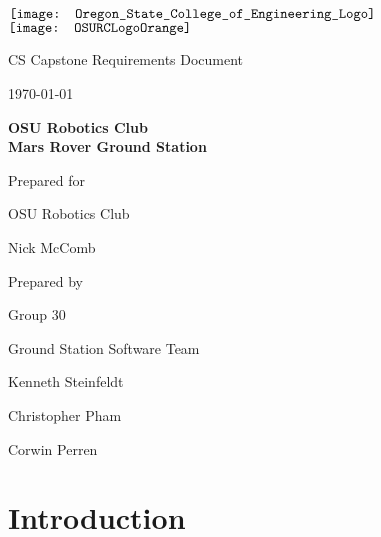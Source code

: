 \documentclass[onecolumn, draftclsnofoot, 10pt, compsoc]{IEEEtran}
\def \CapstoneTeamName{			Ground Station Software Team}
\def \CapstoneTeamNumber{		30}
\def \GroupMemberOne{			Kenneth Steinfeldt}
\def \GroupMemberTwo{			Christopher Pham}
\def \GroupMemberThree{			Corwin Perren}
\def \CapstoneProjectName{		OSU Robotics Club\\Mars Rover Ground Station}
\def \CapstoneSponsorCompany{	OSU Robotics Club}
\def \CapstoneSponsorPerson{	Nick McComb}
\def \DocType{	%
				Requirements Document
			 }
\newcommand{\NameSigPair}[1]{
  \par
  \makebox[2.75in][r]{#1} 
  \hfill
  \makebox[3.25in]{
      \makebox[2.25in]{\hrulefill} 
      \hfill
      \makebox[.75in]{\hrulefill}
  }
  \par\vspace{-12pt} 
  \textit{
      \tiny\noindent
      \makebox[2.75in]{} 
      \hfill
      \makebox[3.25in]{
          \makebox[2.25in][r]{Signature} 
          \hfill
          \makebox[.75in][r]{Date}
      }
  }
}
\renewcommand{\NameSigPair}[1]{#1}
\begin{document}
\begin{titlepage}
	\begin{singlespace}
        \begin{minipage}{7in}
			\centering
			\hspace*{-.7in}
			$\vcenter{\hbox{\texttt{[image: Oregon\_State\_College\_of\_Engineering\_Logo]}}}$
			\hspace*{.2in}
			$\vcenter{\hbox{\texttt{[image: OSURCLogoOrange]}}}$
		\end{minipage}

		\par\vspace{.35in}
		\centering
		\scshape{
			\huge CS Capstone \DocType \par
			{\large\today}\par
			\vspace{.5in}
			\textbf{\Huge\CapstoneProjectName}\par
			\vfill
			{\large Prepared for}\par
			\Huge \CapstoneSponsorCompany\par
			\vspace{5pt}
			{\Large\NameSigPair{\CapstoneSponsorPerson}\par}
			{\large Prepared by }\par
			Group\CapstoneTeamNumber\par
			\CapstoneTeamName\par 
			\vspace{5pt}
			{\Large
				\NameSigPair{\GroupMemberOne}\par
				\NameSigPair{\GroupMemberTwo}\par
				\NameSigPair{\GroupMemberThree}\par
			}
			\vspace{20pt}
            \begin{abstract}

		\end{abstract}
		}
	\end{singlespace}
\end{titlepage}
\newpage
{}
\tableofcontents
\clearpage

\section{Introduction}
\end{document}
